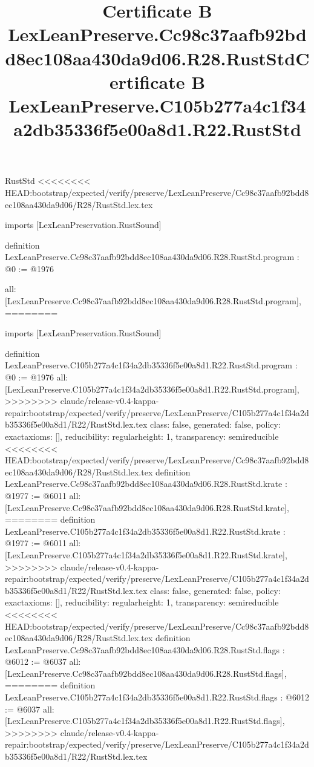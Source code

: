 \begin{lexlean}{RustStd}
<<<<<<<< HEAD:bootstrap/expected/verify/preserve/LexLeanPreserve/Cc98c37aafb92bdd8ec108aa430da9d06/R28/RustStd.lex.tex
\title{Certificate B LexLeanPreserve.Cc98c37aafb92bdd8ec108aa430da9d06.R28.RustStd}
\begin{coremodule}
imports [LexLeanPreservation.RustSound]

definition LexLeanPreserve.Cc98c37aafb92bdd8ec108aa430da9d06.R28.RustStd.program : @0 := @1976 {
  all: [LexLeanPreserve.Cc98c37aafb92bdd8ec108aa430da9d06.R28.RustStd.program],
========
\title{Certificate B LexLeanPreserve.C105b277a4c1f34a2db35336f5e00a8d1.R22.RustStd}
\begin{coremodule}
imports [LexLeanPreservation.RustSound]

definition LexLeanPreserve.C105b277a4c1f34a2db35336f5e00a8d1.R22.RustStd.program : @0 := @1976 {
  all: [LexLeanPreserve.C105b277a4c1f34a2db35336f5e00a8d1.R22.RustStd.program],
>>>>>>>> claude/release-v0.4-kappa-repair:bootstrap/expected/verify/preserve/LexLeanPreserve/C105b277a4c1f34a2db35336f5e00a8d1/R22/RustStd.lex.tex
  class: false,
  generated: false,
  policy: exact{axioms: []},
  reducibility: regular{height: 1},
  transparency: semireducible
}
<<<<<<<< HEAD:bootstrap/expected/verify/preserve/LexLeanPreserve/Cc98c37aafb92bdd8ec108aa430da9d06/R28/RustStd.lex.tex
definition LexLeanPreserve.Cc98c37aafb92bdd8ec108aa430da9d06.R28.RustStd.krate : @1977 := @6011 {
  all: [LexLeanPreserve.Cc98c37aafb92bdd8ec108aa430da9d06.R28.RustStd.krate],
========
definition LexLeanPreserve.C105b277a4c1f34a2db35336f5e00a8d1.R22.RustStd.krate : @1977 := @6011 {
  all: [LexLeanPreserve.C105b277a4c1f34a2db35336f5e00a8d1.R22.RustStd.krate],
>>>>>>>> claude/release-v0.4-kappa-repair:bootstrap/expected/verify/preserve/LexLeanPreserve/C105b277a4c1f34a2db35336f5e00a8d1/R22/RustStd.lex.tex
  class: false,
  generated: false,
  policy: exact{axioms: []},
  reducibility: regular{height: 1},
  transparency: semireducible
}
<<<<<<<< HEAD:bootstrap/expected/verify/preserve/LexLeanPreserve/Cc98c37aafb92bdd8ec108aa430da9d06/R28/RustStd.lex.tex
definition LexLeanPreserve.Cc98c37aafb92bdd8ec108aa430da9d06.R28.RustStd.flags : @6012 := @6037 {
  all: [LexLeanPreserve.Cc98c37aafb92bdd8ec108aa430da9d06.R28.RustStd.flags],
========
definition LexLeanPreserve.C105b277a4c1f34a2db35336f5e00a8d1.R22.RustStd.flags : @6012 := @6037 {
  all: [LexLeanPreserve.C105b277a4c1f34a2db35336f5e00a8d1.R22.RustStd.flags],
>>>>>>>> claude/release-v0.4-kappa-repair:bootstrap/expected/verify/preserve/LexLeanPreserve/C105b277a4c1f34a2db35336f5e00a8d1/R22/RustStd.lex.tex
}}}
\end{coremodule}}
\end{coremodule}
\end{lexlean}
